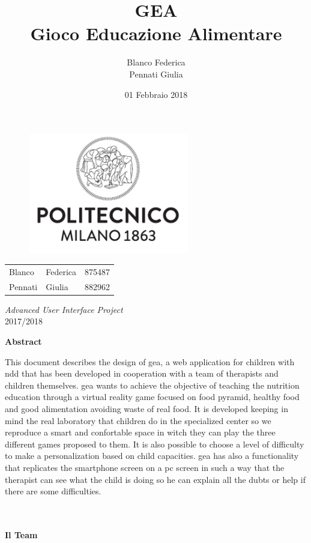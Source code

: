 \documentclass[a4paper, 12pt]{article}
\title{\textbf{GEA}\\[3mm]
Gioco Educazione Alimentare}
\author{Blanco Federica\\Pennati Giulia%
}
\date{01 Febbraio 2018} %
\makeatletter
\renewcommand{\maketitle}{ 
\begin{figure}[h]
\centering
\includegraphics[width=7cm]{Images/LogoPolimi}\\[.5cm]
\end{figure}

\vspace{50pt}

\begin{flushright} %
\@date 

{\huge\@title} %
\vspace{140pt} %


\begin{tabular}{ l l c}
\large Blanco &  \large Federica & \large 875487\\
\large Pennati & \large Giulia & \large 882962\\
\end{tabular}

\vspace{40pt} %
\end{flushright}
\centering
\textsl{\large Advanced User Interface Project}\\
2017/2018
}
\makeatother
\begin{document}
\begin{titlepage}

\thispagestyle{empty}
\maketitle %

\end{titlepage}

\clearpage
\begin{center}
\textbf{Abstract}\\
\end{center}
This document describes the design of \acs{gea}, a web application for children with \acl{ndd} that has been developed in cooperation with a team of therapists and children themselves. \acs{gea} wants to achieve the objective of teaching the nutrition education through a virtual reality game focused on food pyramid, healthy food and good alimentation avoiding waste of real food. It is developed keeping in mind the real laboratory that children do in the specialized center so we reproduce a smart and confortable space in witch they can play the three different games proposed to them. It is also possible to choose a level of difficulty to make a personalization based on child capacities. \acs{gea} has also a functionality that replicates the smartphone screen on a pc screen in such a way that the therapist can see what the child is doing so he can explain all the dubts or help if there are some difficulties. %
\\
\\
\\
\begin{center}
\textbf{Il Team}\\
\end{center}
\vspace{20px}
\end{document}
